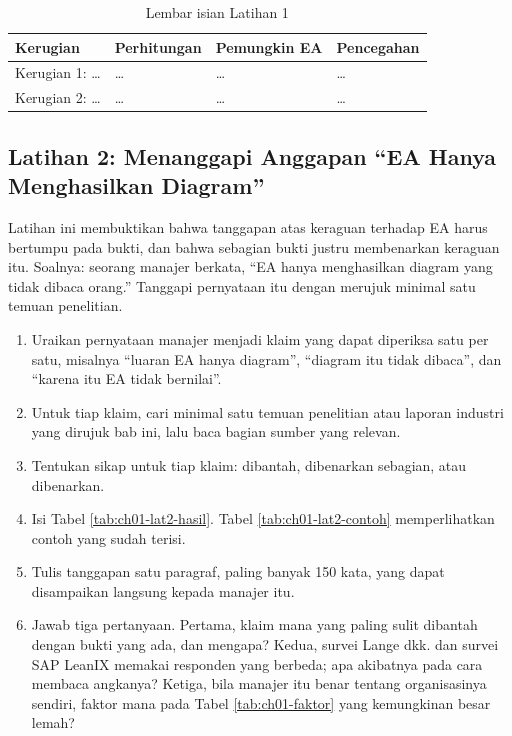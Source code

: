 \begin{table}[!htb]
  \centering
  \caption{Lembar isian Latihan 1}
  \label{tab:ch01-lat1-hasil}
  \footnotesize
  \begin{tabularx}{\textwidth}{>{\raggedright\arraybackslash}p{2.4cm}
      >{\raggedright\arraybackslash}X >{\raggedright\arraybackslash}p{2.1cm}
      >{\raggedright\arraybackslash}X}
    \hline
    \textbf{Kerugian} & \textbf{Perhitungan} & \textbf{Pemungkin EA} & \textbf{Pencegahan} \\
    \hline
    Kerugian 1: \dots & \dots & \dots & \dots \\
    \hline
    Kerugian 2: \dots & \dots & \dots & \dots \\
    \hline
  \end{tabularx}
\end{table}

\subsection*{Latihan 2: Menanggapi Anggapan ``EA Hanya Menghasilkan Diagram''}

Latihan ini membuktikan bahwa tanggapan atas keraguan terhadap EA harus
bertumpu pada bukti, dan bahwa sebagian bukti justru membenarkan keraguan itu.
Soalnya: seorang manajer berkata, ``EA hanya menghasilkan diagram yang tidak
dibaca orang.'' Tanggapi pernyataan itu dengan merujuk minimal satu temuan
penelitian.

\begin{enumerate}
  \item Uraikan pernyataan manajer menjadi klaim yang dapat diperiksa satu per
        satu, misalnya ``luaran EA hanya diagram'', ``diagram itu tidak
        dibaca'', dan ``karena itu EA tidak bernilai''.
  \item Untuk tiap klaim, cari minimal satu temuan penelitian atau laporan
        industri yang dirujuk bab ini, lalu baca bagian sumber yang relevan.
  \item Tentukan sikap untuk tiap klaim: dibantah, dibenarkan sebagian, atau
        dibenarkan.
  \item Isi Tabel \ref{tab:ch01-lat2-hasil}. Tabel \ref{tab:ch01-lat2-contoh}
        memperlihatkan contoh yang sudah terisi.
  \item Tulis tanggapan satu paragraf, paling banyak 150 kata, yang dapat
        disampaikan langsung kepada manajer itu.
  \item Jawab tiga pertanyaan. Pertama, klaim mana yang paling sulit dibantah
        dengan bukti yang ada, dan mengapa? Kedua, survei Lange dkk. dan survei
        SAP LeanIX memakai responden yang berbeda; apa akibatnya pada cara
        membaca angkanya? Ketiga, bila manajer itu benar tentang organisasinya
        sendiri, faktor mana pada Tabel \ref{tab:ch01-faktor} yang kemungkinan
        besar lemah?
\end{enumerate}

